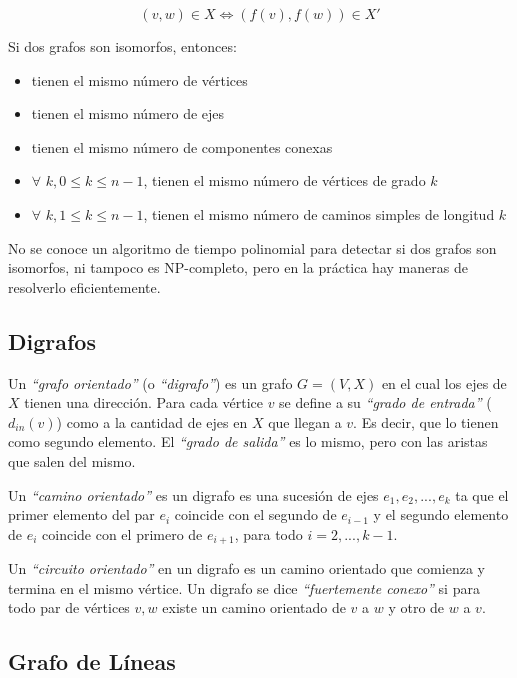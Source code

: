 \begin{figure}[h]
\[ (v,w) \in X \Longleftrightarrow (f(v), f(w)) \in X' \]
\end{figure}

Si dos grafos son isomorfos, entonces:

\begin{itemize}
\item tienen el mismo n\'umero de v\'ertices
\item tienen el mismo n\'umero de ejes
\item tienen el mismo n\'umero de componentes conexas
\item $\forall$ $k, 0 \leq k \leq n-1$, tienen el mismo n\'umero de v\'ertices de grado $k$
\item $\forall$ $k, 1 \leq k \leq n-1$, tienen el mismo n\'umero de caminos simples de longitud $k$
\end{itemize}

No se conoce un algoritmo de tiempo polinomial para detectar si dos grafos son isomorfos, ni tampoco es NP-completo, pero en la pr\'actica hay maneras de resolverlo eficientemente.

\newpage
\subsection{Digrafos}

Un \emph{``grafo orientado''} (o \emph{``digrafo''}) es un grafo $G=(V,X)$ en el cual los ejes de $X$ tienen una direcci\'on. Para cada v\'ertice $v$ se define a su \emph{``grado de entrada''} ($d_{in}(v)$) como a la cantidad de ejes en $X$ que llegan a $v$. Es decir, que lo tienen como segundo elemento. El \emph{``grado de salida''} es lo mismo, pero con las aristas que salen del mismo.

Un \emph{``camino orientado''} es un digrafo es una sucesi\'on de ejes $e_1, e_2, ..., e_k$ ta que el primer elemento del par $e_i$ coincide con el segundo de $e_{i-1}$ y el segundo elemento de $e_i$ coincide con el primero de $e_{i+1}$, para todo $i = 2, ..., k-1$.

Un \emph{``circuito orientado''} en un digrafo es un camino orientado que comienza y termina en el mismo v\'ertice. Un digrafo se dice \emph{``fuertemente conexo''} si para todo par de v\'ertices $v,w$ existe un camino orientado de $v$ a $w$ y otro de $w$ a $v$.

\subsection{Grafo de L\'ineas}

